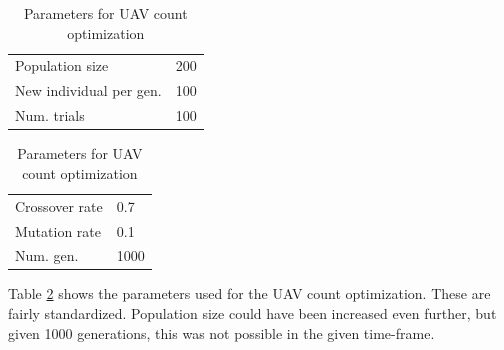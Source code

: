 \documentclass[10pt,a4paper]{book}
\begin{document}
\begin{table}[H]
\centering
\caption{Parameters for \gls{UAV} count optimization}
\begin{minipage}{50mm}
\small
\begin{tabular}{l l}
Population size & 200   \\  
New individual per gen. & 100  \\
Num. trials & 100  

\end{tabular}
\end{minipage}
\centering
\begin{minipage}{50mm}
\small
\begin{tabular}{l l}
Crossover rate & 0.7 \\ 
Mutation rate & 0.1  \\ 
Num. gen. & 1000  

\end{tabular}
\label{TAB_MOEA_UAV_PARAMS}
\end{minipage}
\end{table}

Table \ref{TAB_MOEA_UAV_PARAMS} shows the parameters used for the \gls{UAV} count optimization. These are fairly standardized. Population size could have been increased even further, but given 1000 generations, this was not possible in the given time-frame.
\end{document}
